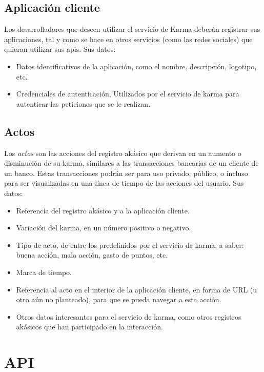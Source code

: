 \documentclass[main]{subfiles}
\begin{document}
\subsection*{Aplicación cliente}
Los desarrolladores que deseen utilizar el servicio de Karma deberán registrar sus aplicaciones, tal y como se hace en otros servicios (como las redes sociales) que quieran utilizar sus \glspl{api}. Sus datos:

\begin{itemize}
  \item Datos identificativos de la aplicación, como el nombre, descripción, logotipo, etc.
  \item Credenciales de autenticación, Utilizados por el servicio de karma para autenticar las peticiones que se le realizan.
\end{itemize}

\subsection*{Actos}
Los \emph{actos} son las acciones del registro akásico que derivan en un aumento o disminución de su karma, similares a las transacciones bancarias de un cliente de un banco. Estas transacciones podrán ser para uso privado, público, o incluso para ser visualizadas en una línea de tiempo de las acciones del usuario. Sus datos:

\begin{itemize}
  \item Referencia del registro akásico y a la aplicación cliente.
  \item Variación del karma, en un número positivo o negativo.
  \item Tipo de acto, de entre los predefinidos por el servicio de karma, a saber: buena acción, mala acción, gasto de puntos, etc.
  \item Marca de tiempo.
  \item Referencia al acto en el interior de la aplicación cliente, en forma de URL (u otro aún no planteado), para que se pueda navegar a esta acción.
  \item Otros datos interesantes para el servicio de karma, como otros registros akásicos que han participado en la interacción.
\end{itemize}

\section{API}
\end{document}
